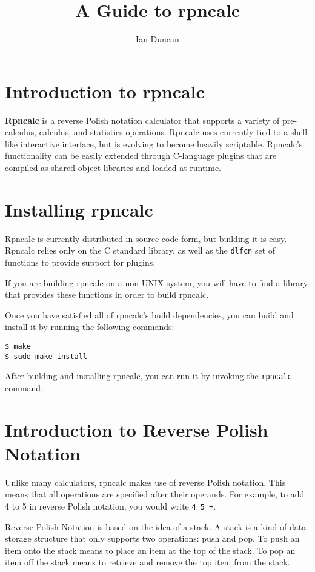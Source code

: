 \documentclass[12pt,letterpaper]{book}
\title{A Guide to rpncalc}
\author{Ian Duncan}
\begin{document}
\maketitle
\tableofcontents
\section{Introduction to rpncalc}
\textbf{Rpncalc} is a reverse Polish notation calculator that supports a variety of pre-calculus, calculus, and statistics operations. Rpncalc uses currently tied to a shell-like interactive interface, but is evolving to become heavily scriptable. Rpncalc's functionality can be easily extended through C-language plugins that are compiled as shared object libraries and loaded at runtime. 

\section{Installing rpncalc}

Rpncalc is currently distributed in source code form, but building it is easy. Rpncalc relies only on the C standard library, as well as the \verb|dlfcn| set of functions to provide support for plugins.

If you are building rpncalc on a non-UNIX system, you will have to find a library that provides these functions in order to build rpncalc.

Once you have satisfied all of rpncalc's build dependencies, you can build and install it by running the following commands:

\begin{lstlisting}
$ make
$ sudo make install
\end{lstlisting}

After building and installing rpncalc, you can run it by invoking the \verb|rpncalc| command.

\section{Introduction to Reverse Polish Notation}

Unlike many calculators, rpncalc makes use of reverse Polish notation. This means that all operations are specified after their operands. For example, to add 4 to 5 in reverse Polish notation, you would write \verb|4 5 +|.

Reverse Polish Notation is based on the idea of a stack. A stack is a kind of data storage structure that only supports two operations: push and pop. To push an item onto the stack means to place an item at the top of the stack. To pop an item off the stack means to retrieve and remove the top item from the stack.
\end{document}
